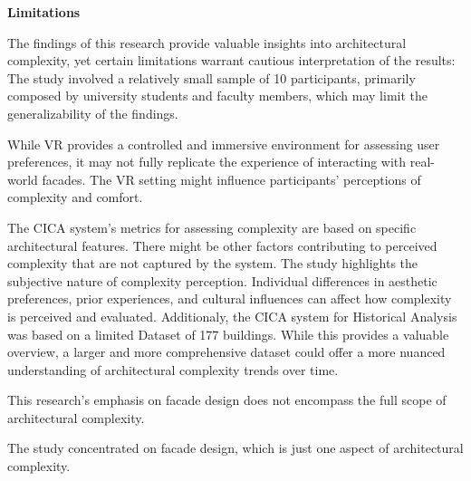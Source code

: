 
\textbf{Limitations}

The findings of this research provide valuable insights  into architectural complexity, yet certain limitations warrant cautious interpretation of the results:
The study involved a relatively small sample of 10 participants, primarily composed by university students and faculty members, which may limit the generalizability of the findings.

While VR provides a controlled and immersive environment for assessing user preferences, it may not fully replicate the experience of interacting with real-world facades.
The VR setting might influence participants' perceptions of complexity and comfort.

The CICA system's metrics for assessing complexity are based on specific architectural features.
There might be other factors contributing to perceived complexity that are not captured by the system.
The study highlights the subjective nature of complexity perception.
Individual differences in aesthetic preferences, prior experiences, and cultural influences can affect how complexity is perceived and evaluated.
Additionaly, the CICA system for Historical Analysis was based on a limited Dataset of 177 buildings.
While this provides a valuable overview, a larger and more comprehensive dataset could offer a more nuanced understanding of architectural complexity trends over time.

This research's emphasis on facade design does not encompass the full scope of architectural complexity.

The study concentrated on facade design, which is just one aspect of architectural complexity.



%
%

